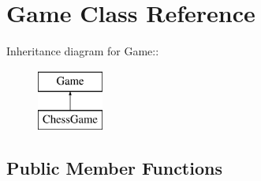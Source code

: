 \hypertarget{classGame}{
\section{Game Class Reference}
\label{classGame}
}
Inheritance diagram for Game::\begin{figure}[H]
\begin{center}
\leavevmode
\includegraphics[height=2cm]{classGame}
\end{center}
\end{figure}
\subsection*{Public Member Functions}
